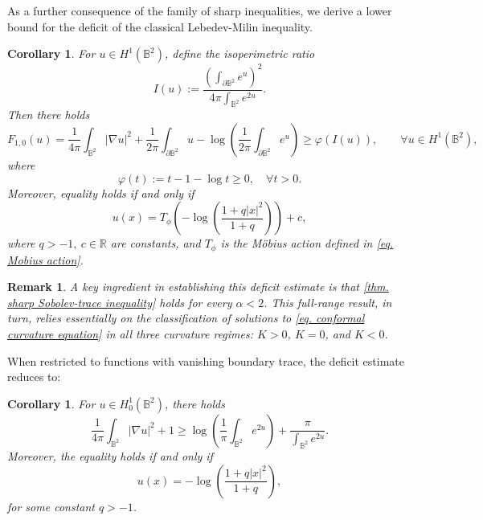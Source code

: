 \documentclass[11pt,a4paper,twoside]{amsart}
\newtheorem{corollary}[theorem]{Corollary}
\newtheorem{remark}[theorem]{Remark}
\newtheorem{sketch proof}{Sketch of the proof}[section]
\begin{document}
    \vspace{1em}

    As a further consequence of the family of sharp inequalities, we derive a lower bound for the deficit of the classical Lebedev-Milin inequality.

    \begin{corollary}
    \label{cor. stability for LM inequality}
        For $u\in H^1(\mathbb{B}^2)$, define the isoperimetric ratio
        \begin{equation*}
            I(u):=\frac{\left(\int_{\partial\mathbb{B}^2}e^{u}\right)^2}{4\pi\int_{\mathbb{B}^2}e^{2u}}.
        \end{equation*}
       Then there holds
       \begin{equation*}
          F_{1,0}(u)=\frac{1}{4\pi}
        \int_{\mathbb{B}^2}|\nabla u|^2
        +\frac{1}{2\pi}
        \int_{\partial \mathbb{B}^2}u
        -\log\left(
        \frac{1}{2\pi}
        \int_{\partial\mathbb{B}^2}e^{u}
        \right)
        \geq \varphi(I(u)), \qquad \forall u\in H^1(\mathbb{B}^2),
       \end{equation*}
       where 
       \begin{equation*}
           \varphi(t):=t-1-\log t\geq0,\quad \forall t>0.
       \end{equation*}
       Moreover, equality holds if and only if 
       \begin{equation}
       \label{eq. minimizer}
           u(x)=T_\phi
           \left(
           -\log
        \left(\frac{1+q|x|^2}{1+q}\right)
           \right)+c,
       \end{equation}
       where $q>-1,\ c\in\mathbb{R}$ are constants, and $T_\phi$ is the M\"obius action defined in \cref{eq. Mobius action}.
    \end{corollary}
    \begin{remark}
        A key ingredient in establishing this deficit estimate is that \cref{thm. sharp Sobolev-trace inequality} holds for every $\alpha<2$.
        This full-range result, in turn, relies essentially on the classification of solutions to \cref{eq. conformal curvature equation} in all three curvature regimes: $K>0$, $K=0$, and $K<0$.
    \end{remark}
    When restricted to functions with vanishing  boundary trace, the deficit estimate reduces to:
    \begin{corollary}\label{cor. sharp Carleson-Chang ineq}
        For $u\in H_0^1(\mathbb{B}^2)$, there holds
        \begin{equation}
        \label{Carleson-Chang improv}
        \frac{1}{4\pi}
        \int_{\mathbb{B}^2}|\nabla u|^2
        +1
        \geq 
        \log\left(\frac{1}{\pi}\int_{\mathbb{B}^2}e^{2u}\right)
        +\frac{\pi}{\int_{\mathbb{B}^2}e^{2u}}.
        \end{equation}
        Moreover, the equality holds if and only if
        \[
        u(x)=-\log
        \left(\frac{1+q|x|^2}{1+q}\right),
        \] 
        for some constant $q>-1$. 
    \end{corollary}
\end{document}
